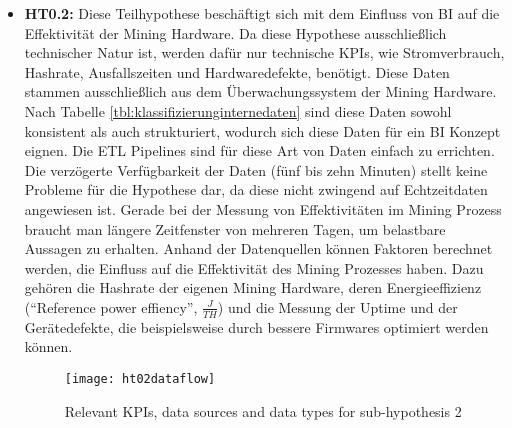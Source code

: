 \begin{itemize}
    \begin{figure}[H]
        \caption{Relevant KPIs, data sources and data types for sub-hypothesis 1}
        \texttt{[image: ht01dataflow]}
        \label{figure:ht01dataflow}
    \end{figure}

    \item \textbf{\ac{HT0.2}: }Diese Teilhypothese beschäftigt sich mit dem Einfluss von \ac{BI} auf die Effektivität der
    Mining Hardware. Da diese Hypothese ausschließlich technischer Natur ist, werden dafür nur technische \acp{KPI}, wie
    Stromverbrauch, Hashrate, Ausfallszeiten und Hardwaredefekte, benötigt. Diese Daten stammen ausschließlich aus dem
    Überwachungssystem der Mining Hardware. Nach Tabelle \ref{tbl:klassifizierunginternedaten} sind diese Daten sowohl
    konsistent als auch strukturiert, wodurch sich diese Daten für ein \ac{BI} Konzept eignen. Die \ac{ETL} Pipelines sind
    für diese Art von Daten einfach zu errichten. Die verzögerte Verfügbarkeit der Daten (fünf bis zehn Minuten) stellt keine
    Probleme für die Hypothese dar, da diese nicht zwingend auf Echtzeitdaten angewiesen ist. Gerade bei der Messung von
    Effektivitäten im Mining Prozess braucht man längere Zeitfenster von mehreren Tagen, um belastbare Aussagen zu erhalten.
    Anhand der Datenquellen können Faktoren berechnet werden, die Einfluss auf die Effektivität des Mining Prozesses haben.
    Dazu gehören die Hashrate der eigenen Mining Hardware, deren Energieeffizienz ("`Reference power effiency"',
    $\frac{J}{TH}$) und die Messung der Uptime und der Gerätedefekte, die beispielsweise durch bessere Firmwares optimiert
    werden können.

    \begin{figure}[H]
        \caption{Relevant KPIs, data sources and data types for sub-hypothesis 2}
        \texttt{[image: ht02dataflow]}
        \label{figure:ht02dataflow}
    \end{figure}


\end{itemize}
